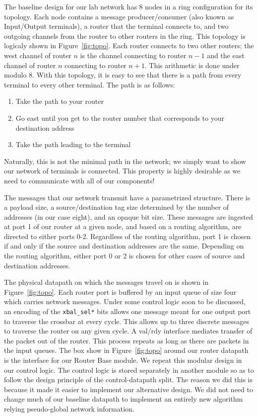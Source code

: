 \documentclass[10pt]{article}
\begin{document}
The baseline design for our lab network has 8 nodes in a ring configuration
for its topology. 
Each node contains a message producer/consumer (also known as Input/Output 
terminals), a router that the terminal connects to,
and two outgoing channels from the router to other routers in the ring.
This topology is logicaly shown in Figure~\ref{fig:topo}. 
Each router connects to two other routers; the west channel of router $n$ 
is the channel connecting to router $n-1$ and 
the east channel of router $n$ connecting to router $n+1$.
This arithmetic is done under modulo 8.
With this topology, it is easy to see that there is a path from every terminal
to every other terminal.
The path is as follows:
\begin{enumerate}[nolistsep]
	\item Take the path to your router
	\item Go east until you get to the router number that corresponds to your 
		  destination address
	\item Take the path leading to the terminal
\end{enumerate}
Naturally, this is not the minimal path in the network; we simply want to show
our network of terminals is connected.
This property is highly desirable as we need to communicate with 
all of our components! \par

The messages that our network transmit have a parametrized structure.
There is a payload size, a source/destination tag size determined by the number
of addresses (in our case eight), and an opaque bit size.
These messages are ingested at port 1 of our router at a given node, and based
on a routing algorithm, are directed to either ports 0-2.
Regardless of the routing algorithm, port 1 is chosen if and only if 
the source and destination addresses are the same.
Depending on the routing algorithm, either port 0 or 2 is chosen for other
cases of source and destination addresses. \par

The physical datapath on which the messages travel on is shown in 
Figure~\ref{fig:topo}.
Each router port is buffered by an input queue of size four which carries
network messages. 
Under some control logic soon to be discussed, an encoding of the 
\texttt{xbal\_sel*} bits allows one message meant for one output port to
traverse the crossbar at every cycle.
This allows up to three discrete messages to traverse the router on any 
given cycle.
A val/rdy interface mediates transfer of the packet out of the router. 
This process repeats as long as there are packets in the input queues.
The box show in Figure~\ref{fig:topo} around our router datapath is the 
interface for our Router Base module. 
We repeat this modular design in our control logic.
The control logic is stored separately in another module so as to follow the
design principle of the control-datapath split. 
The reason we did this is because it made it easier to implement our 
alternative design.
We did not need to change much of our baseline datapath to implement an 
entirely new algorithm relying pseudo-global network information. \par
\end{document}
